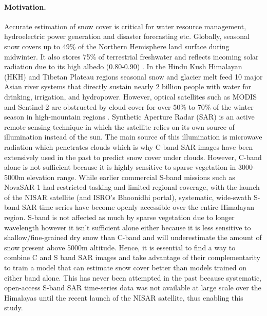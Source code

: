 \documentclass{article}
\begin{document}
\paragraph{Motivation.}
Accurate estimation of snow cover is critical for water resource management, hydroelectric power generation and disaster forecasting etc.
Globally, seasonal snow covers up to 49\% of the Northern Hemisphere land surface during midwinter. It also stores 75\% of terrestrial freshwater and reflects incoming solar radiation due to its high albedo (0.80-0.90) \citep{briand2026weakly}. In the Hindu Kush Himalayan (HKH) and Tibetan Plateau regions seasonal snow and glacier melt feed 10 major Asian river systems that directly sustain nearly 2 billion people with water for drinking, irrigation, and hydropower. However, optical satellites such as MODIS and Sentinel-2 are obstructed by cloud cover for over 50\% to 70\% of the winter season in high-mountain regions \citep{briand2026weakly}. Synthetic Aperture Radar (SAR) is an active remote sensing technique in which the satellite relies on its own source of illumination instead of the sun. The main source of this illumination is microwave radiation which penetrates clouds which is why C-band SAR images have been extensively used in the past to predict snow cover under clouds. However, C-band alone is not sufficient because it is highly sensitive to sparse vegetation in 3000-5000m elevation range. While earlier commercial S-band missions such as NovaSAR-1 had restricted tasking and limited regional coverage, with the launch of the NISAR satellite (and ISRO's Bhoonidhi portal), systematic, wide-swath S-band SAR time series have become openly accessible over the entire Himalayan region. S-band is not affected as much by sparse vegetation due to longer wavelength however it isn't sufficient alone either because it is less sensitive to shallow/fine-grained dry snow than C-band and will underestimate the amount of snow present above 5000m altitude. Hence, it is essential to find a way to combine C and S band SAR images and take advantage of their complementarity to train a model that can estimate snow cover better than models trained on either band alone. This has never been attempted in the past because systematic, open-access S-band SAR time-series data was not available at large scale over the Himalayas until the recent launch of the NISAR satellite, thus enabling this study.
\end{document}
